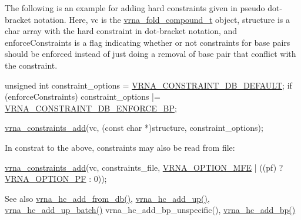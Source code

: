 The following is an example for adding hard constraints given in pseudo dot-\/bracket notation. Here, {\ttfamily vc} is the \hyperlink{group__fold__compound_ga1b0cef17fd40466cef5968eaeeff6166}{vrna\+\_\+fold\+\_\+compound\+\_\+t} object, {\ttfamily structure} is a char array with the hard constraint in dot-\/bracket notation, and {\ttfamily enforce\+Constraints} is a flag indicating whether or not constraints for base pairs should be enforced instead of just doing a removal of base pair that conflict with the constraint.


\begin{DoxyCodeInclude}
          \textcolor{keywordtype}{unsigned} \textcolor{keywordtype}{int} constraint\_options = \hyperlink{group__hard__constraints_ga1c3864bdc92147a4d93de2b1b4356177}{VRNA\_CONSTRAINT\_DB\_DEFAULT};
          \textcolor{keywordflow}{if} (enforceConstraints)
            constraint\_options |= \hyperlink{group__hard__constraints_ga29ebe940110d60ab798fdacbcdbbfb7d}{VRNA\_CONSTRAINT\_DB\_ENFORCE\_BP};

          \hyperlink{group__constraints_ga35a401f680969a556858a8dd5f1d07cc}{vrna\_constraints\_add}(vc, (\textcolor{keyword}{const} \textcolor{keywordtype}{char} *)structure, constraint\_options);
\end{DoxyCodeInclude}
 In constrat to the above, constraints may also be read from file\+:


\begin{DoxyCodeInclude}
        \hyperlink{group__constraints_ga35a401f680969a556858a8dd5f1d07cc}{vrna\_constraints\_add}(vc, constraints\_file, 
      \hyperlink{group__fold__compound_gae63be9127fe7dcc1f9bb14f5bb1064ee}{VRNA\_OPTION\_MFE} | ((pf) ? \hyperlink{group__fold__compound_gabfbadcddda3e74ce7f49035ef8f058f7}{VRNA\_OPTION\_PF} : 0));
\end{DoxyCodeInclude}
 \begin{DoxySeeAlso}{See also}
\hyperlink{group__hard__constraints_ga5b4de3247b67358080c176b94591a8e6}{vrna\+\_\+hc\+\_\+add\+\_\+from\+\_\+db()}, \hyperlink{group__hard__constraints_gaeb352e3e6ccd2b567bafa451365bb545}{vrna\+\_\+hc\+\_\+add\+\_\+up()}, \hyperlink{group__hard__constraints_ga5070f296c8af2baea10951525519464f}{vrna\+\_\+hc\+\_\+add\+\_\+up\+\_\+batch()} vrna\+\_\+hc\+\_\+add\+\_\+bp\+\_\+unspecific(), \hyperlink{group__hard__constraints_gac49305fc5c7d8653c5fbd2de1e1615e2}{vrna\+\_\+hc\+\_\+add\+\_\+bp()}
\end{DoxySeeAlso}

